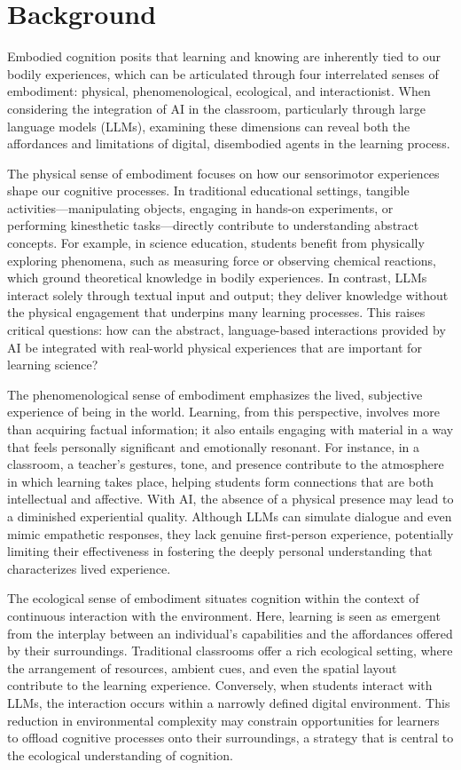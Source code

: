 \documentclass[pdflatex,sn-apa]{sn-jnl}%
\theoremstyle{thmstyleone}%
\theoremstyle{thmstyletwo}%
\theoremstyle{thmstylethree}%
\begin{document}
\section{Background}
Embodied cognition posits that learning and knowing are inherently tied to our bodily experiences, which can be articulated through four interrelated senses of embodiment: physical, phenomenological, ecological, and interactionist. When considering the integration of AI in the classroom, particularly through large language models (LLMs), examining these dimensions can reveal both the affordances and limitations of digital, disembodied agents in the learning process.

The physical sense of embodiment focuses on how our sensorimotor experiences shape our cognitive processes. In traditional educational settings, tangible activities—manipulating objects, engaging in hands-on experiments, or performing kinesthetic tasks—directly contribute to understanding abstract concepts. For example, in science education, students benefit from physically exploring phenomena, such as measuring force or observing chemical reactions, which ground theoretical knowledge in bodily experiences. In contrast, LLMs interact solely through textual input and output; they deliver knowledge without the physical engagement that underpins many learning processes. This raises critical questions: how can the abstract, language-based interactions provided by AI be integrated with real-world physical experiences that are important for learning science?

The phenomenological sense of embodiment emphasizes the lived, subjective experience of being in the world. Learning, from this perspective, involves more than acquiring factual information; it also entails engaging with material in a way that feels personally significant and emotionally resonant. For instance, in a classroom, a teacher’s gestures, tone, and presence contribute to the atmosphere in which learning takes place, helping students form connections that are both intellectual and affective. With AI, the absence of a physical presence may lead to a diminished experiential quality. Although LLMs can simulate dialogue and even mimic empathetic responses, they lack genuine first-person experience, potentially limiting their effectiveness in fostering the deeply personal understanding that characterizes lived experience.

The ecological sense of embodiment situates cognition within the context of continuous interaction with the environment. Here, learning is seen as emergent from the interplay between an individual’s capabilities and the affordances offered by their surroundings. Traditional classrooms offer a rich ecological setting, where the arrangement of resources, ambient cues, and even the spatial layout contribute to the learning experience. Conversely, when students interact with LLMs, the interaction occurs within a narrowly defined digital environment. This reduction in environmental complexity may constrain opportunities for learners to offload cognitive processes onto their surroundings, a strategy that is central to the ecological understanding of cognition.
\end{document}
